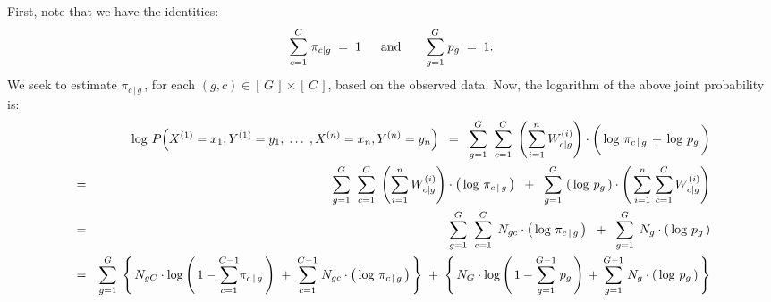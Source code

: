 First, note that we have the identities:
\begin{equation*}
\overset{C}{\underset{c=1}{\sum}}\;\pi_{c\vert g} \; = \; 1
\;\;\quad\textnormal{and}\quad\quad
\overset{G}{\underset{g=1}{\sum}}\;p_{g} \; = \; 1.
\end{equation*}
We seek to estimate $\pi_{c\,\vert\,g}$\,,
for each $(g,c) \in \left[\,G\,\right] \times \left[\,C\,\right]$,
based on the observed data.
Now, the logarithm of the above joint probability is:
\begin{eqnarray*}
&&
	\log\,P\!\left(X^{(1)} = x_{1},Y^{(1)}=y_{1}, \;\ldots\; ,X^{(n)} = x_{n},Y^{(n)}=y_{n}\right)
\;\;=\;\;
	\overset{G}{\underset{g=1}{\sum}} \;\; \overset{C}{\underset{c=1}{\sum}} \;
	\left(\overset{n}{\underset{i=1}{\sum}}\,W^{(i)}_{c \vert g}\right)
	\cdot
	\left(\,\log\,\pi_{c\,\vert\,g} \,\overset{{\color{white}\vert}}{+}\, \log\,p_{g}\,\right)
\\
&=&
	\overset{G}{\underset{g=1}{\sum}} \;\; \overset{C}{\underset{c=1}{\sum}} \;
	\left(\overset{n}{\underset{i=1}{\sum}}\,W^{(i)}_{c \vert g}\right)
	\cdot
	\left(\,\log\,\pi_{c\,\vert\,g}\,\right)
	\;\; + \;\;
	\overset{G}{\underset{g=1}{\sum}} \, \left(\,\log\,p_{g}\,\right)
	\cdot
	\left(\,
		\overset{n}{\underset{i=1}{\sum}} \;
		\overset{C}{\underset{c=1}{\sum}} \,
		W^{(i)}_{c \vert g}
	\right)
\\
&=&
	\overset{G}{\underset{g=1}{\sum}} \;\; \overset{C}{\underset{c=1}{\sum}} \;\,
	N_{gc} \cdot \left(\,\log\,\pi_{c\,\vert\,g}\,\right)
	\;\; + \;\;
	\overset{G}{\underset{g=1}{\sum}} \;\, N_{g} \cdot \left(\,\log\,p_{g}\,\right)
\\
&=&
	\overset{G}{\underset{g=1}{\sum}} \;
	\left\{\,
		N_{gC}
		\cdot
		\log\left(\,1 - \overset{C-1}{\underset{c=1}{\sum}}\pi_{c\,\vert\,g}\,\right)
		\; + \;
		\overset{C-1}{\underset{c=1}{\sum}} \; N_{gc}
		\cdot
		\left(\,\log\,\pi_{c\,\vert\,g}\,\right)
	\,\right\}
	\; + \;
	\left\{\,
		N_{G}
		\cdot
		\log\left(\,1 - \overset{G-1}{\underset{g=1}{\sum}}\;p_{g}\,\right)
		\, + \,
		\overset{G-1}{\underset{g=1}{\sum}} \; N_{g}
		\cdot
		\left(\,\log\,p_{g}\,\right)
	\,\right\}
\end{eqnarray*}
